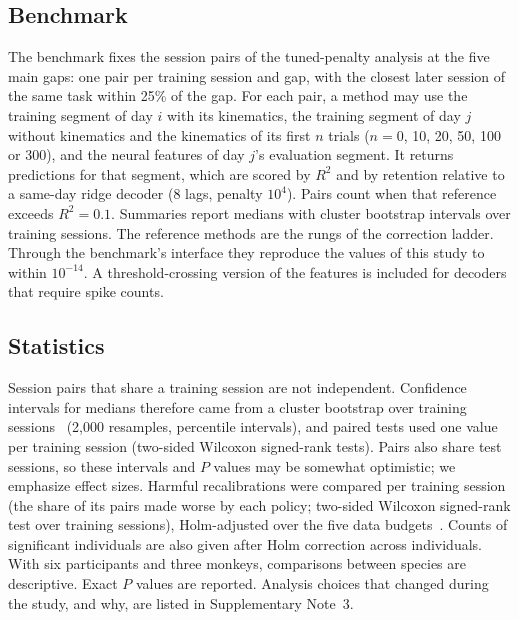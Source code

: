 \documentclass{iopjournal}
\begin{document}
\subsection{Benchmark}

The benchmark fixes the session pairs of the tuned-penalty analysis at the five main gaps: one pair per training session
and gap, with the closest later session of the same task within 25\% of the gap. For each pair, a method may use the
training segment of day $i$ with its kinematics, the training segment of day $j$ without kinematics and the kinematics of
its first $n$ trials ($n = 0$, 10, 20, 50, 100 or 300), and the neural features of day $j$'s evaluation segment. It
returns predictions for that segment, which are scored by $R^2$ and by retention relative to a same-day ridge decoder
(8 lags, penalty $10^4$). Pairs count when that reference exceeds $R^2 = 0.1$. Summaries report medians with cluster
bootstrap intervals over training sessions. The reference methods are the rungs of the correction ladder. Through the
benchmark's interface they reproduce the values of this study to within $10^{-14}$. A threshold-crossing version of the
features is included for decoders that require spike counts.

\subsection{Statistics}

Session pairs that share a training session are not independent. Confidence intervals for medians therefore came from a
cluster bootstrap over training sessions~\cite{field2007} (2,000 resamples, percentile intervals), and paired tests used
one value per training session (two-sided Wilcoxon signed-rank tests). Pairs also share test sessions, so these
intervals and $P$ values may be somewhat optimistic; we emphasize effect sizes. Harmful recalibrations were compared
per training session (the share of its pairs made worse by each policy; two-sided Wilcoxon signed-rank test over training
sessions), Holm-adjusted over the five data budgets~\cite{holm1979}. Counts of significant individuals are also given after
Holm correction across individuals. With six participants and three monkeys, comparisons between species are
descriptive. Exact $P$ values are reported. Analysis choices that changed during the study, and why, are listed in
Supplementary Note~3.
\end{document}
